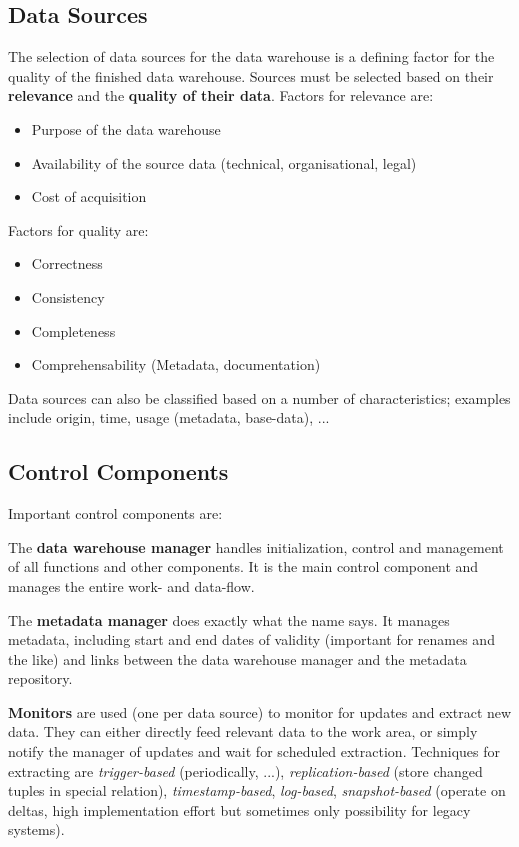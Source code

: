 \documentclass{article}
\begin{document}
\subsection{Data Sources}
The selection of data sources for the data warehouse is a defining factor for the quality of the finished data warehouse.
Sources must be selected based on their \textbf{relevance} and the \textbf{quality of their data}.
Factors for relevance are:
\begin{itemize}
    \item Purpose of the data warehouse
    \item Availability of the source data (technical, organisational, legal)
    \item Cost of acquisition
\end{itemize}
Factors for quality are:
\begin{itemize}
    \item Correctness
    \item Consistency
    \item Completeness
    \item Comprehensability (Metadata, documentation)
\end{itemize}

Data sources can also be classified based on a number of characteristics; examples include origin, time, usage (metadata, base-data), ...

\subsection{Control Components}
Important control components are:

The \textbf{data warehouse manager} handles initialization, control and management of all functions and other components.
It is the main control component and manages the entire work- and data-flow.

The \textbf{metadata manager} does exactly what the name says.
It manages metadata, including start and end dates of validity (important for renames and the like) and links between the data warehouse manager and the metadata repository.

\textbf{Monitors} are used (one per data source) to monitor for updates and extract new data.
They can either directly feed relevant data to the work area, or simply notify the manager of updates and wait for scheduled extraction.
Techniques for extracting are \textit{trigger-based} (periodically, ...), \textit{replication-based} (store changed tuples in special relation), \textit{timestamp-based}, \textit{log-based}, \textit{snapshot-based} (operate on deltas, high implementation effort but sometimes only possibility for legacy systems).
\end{document}
